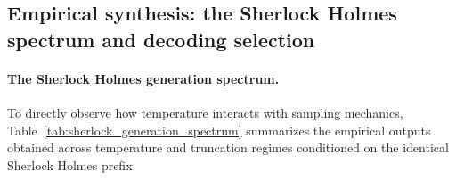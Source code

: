 \documentclass[../../main.tex]{subfiles}
\begin{document}
\subsection{Empirical synthesis: the Sherlock Holmes spectrum and decoding selection}
\label{subsec:empirical_decoding_synthesis}

\paragraph{The Sherlock Holmes generation spectrum.}
To directly observe how temperature interacts with sampling mechanics, Table~\ref{tab:sherlock_generation_spectrum} summarizes the empirical outputs obtained across temperature and truncation regimes conditioned on the identical Sherlock Holmes prefix.
\end{document}
